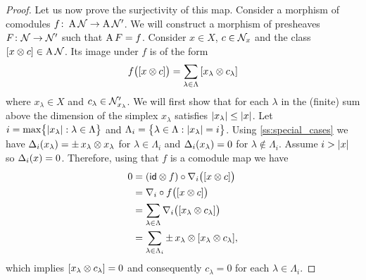 \begin{proof}
	Let us now prove the surjectivity of this map.
	Consider a morphism of comodules $f \colon \assembly \cN \to \assembly \cN'$.
	We will construct a morphism of presheaves $F \colon \cN \to \cN'$ such that $\assembly F = f$.
	Consider $x \in X$, $c \in \cN_x$ and the class $[x \ot c] \in \assembly \cN$.
	Its image under $f$ is of the form
	\[
	f \big( [x \ot c] \big) = \sum_{\lambda \in \Lambda} \, [x_\lambda \ot c_\lambda]
	\]
	where $x_\lambda \in X$ and $c_\lambda \in \cN'_{x_\lambda}$.
	We will first show that for each $\lambda$ in the (finite) sum above the dimension of the simplex $x_\lambda$ satisfies $\bars{x_\lambda} \leq \bars{x}$.
	Let $i = \max \set[\big]{\bars{x_\lambda} : \lambda \in \Lambda}$ and $\Lambda_i = \set[\big]{\lambda \in \Lambda : \bars{x_\lambda} = i}$.
	Using \cref{ss:special_cases} we have $\copr_i(x_{\lambda}) = \pm \, x_{\lambda} \ot x_{\lambda}$ for $\lambda \in \Lambda_i$ and $\copr_i(x_{\lambda}) = 0$ for $\lambda \notin \Lambda_i$.
	Assume $i > \bars{x}$ so $\copr_i(x) = 0$.
	Therefore, using that $f$ is a comodule map we have
	\begin{align*}
		0 &=
		(\id \ot f) \circ \nabla_i \big( [x \ot c] \big) \\&=
		\nabla_i \circ f \big( [x \ot c] \big) \\&=
		\sum_{\lambda \in \Lambda} \nabla_i \big( [x_\lambda \ot c_\lambda] \big) \\&=
		\sum_{\lambda \in \Lambda_i} \pm \, x_\lambda \ot [x_\lambda \ot c_\lambda],
	\end{align*}
	which implies $[x_\lambda \ot c_\lambda] = 0$ and consequently $c_{\lambda} = 0$ for each $\lambda \in \Lambda_i$.


\end{proof}
